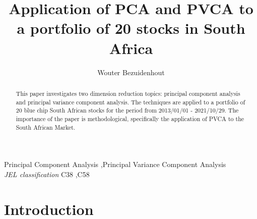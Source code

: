 \documentclass[11pt,preprint, authoryear]{elsarticle}
\numberwithin{equation}{section}
\numberwithin{figure}{section}
\numberwithin{table}{section}
\begin{document}
\begin{frontmatter}  %

\title{Application of PCA and PVCA to a portfolio of 20 stocks in South
Africa}





\author[Add1]{Wouter Bezuidenhout}





\address[Add1]{Stellenbosch Univeristy, South Africa}


\begin{abstract}
\small{
This paper investigates two dimension reduction topics: principal
component analysis and principal variance component analysis. The
techniques are applied to a portfolio of 20 blue chip South African
stocks for the period from 2013/01/01 - 2021/10/29. The importance of
the paper is methodological, specifically the application of PVCA to the
South African Market.
}
\end{abstract}

\vspace{1cm}


\begin{keyword}
\footnotesize{
Principal Component Analysis \sep Principal Variance Component
Analysis \\
\vspace{0.3cm}
}
\footnotesize{
\textit{JEL classification} C38 \sep C58
}
\end{keyword}



\vspace{0.5cm}

\end{frontmatter}



\pagestyle{fancy}
\chead{}
\rhead{}
\lfoot{}
\lhead{}
\cfoot{}


\headsep 35pt %




\hypertarget{introduction}{%
\section{\texorpdfstring{Introduction
\label{Introduction}}{Introduction }}\label{introduction}}
\end{document}
